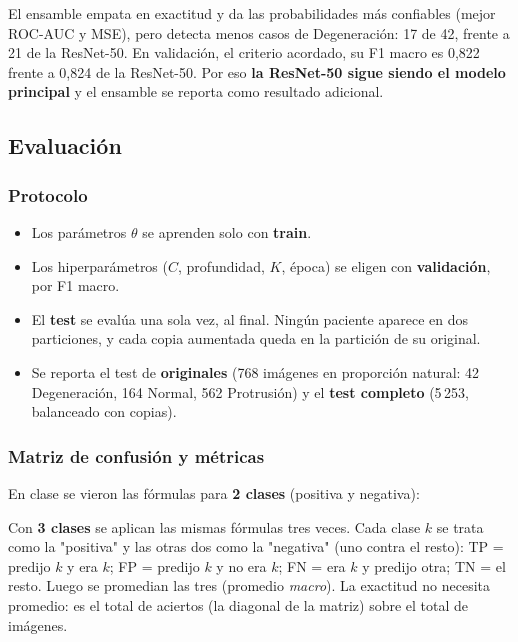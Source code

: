 El ensamble empata en exactitud y da las probabilidades más confiables (mejor ROC-AUC y MSE), pero detecta menos casos de Degeneración: 17 de 42, frente a 21 de la ResNet-50. En validación, el criterio acordado, su F1 macro es 0,822 frente a 0,824 de la ResNet-50. Por eso \textbf{la ResNet-50 sigue siendo el modelo principal} y el ensamble se reporta como resultado adicional.


\subsection{Evaluación}
\label{mm:4}

\subsubsection{Protocolo}
\label{mm:4.1}
\begin{itemize}
  \item Los parámetros $\theta$ se aprenden solo con \textbf{train}.
  \item Los hiperparámetros ($C$, profundidad, $K$, época) se eligen con \textbf{validación}, por F1 macro.
  \item El \textbf{test} se evalúa una sola vez, al final. Ningún paciente aparece en dos particiones, y cada copia aumentada queda en la partición de su original.
  \item Se reporta el test de \textbf{originales} (768 imágenes en proporción natural: 42 Degeneración, 164 Normal, 562 Protrusión) y el \textbf{test completo} (5\,253, balanceado con copias).
\end{itemize}

\subsubsection{Matriz de confusión y métricas}
\label{mm:4.2}
En clase se vieron las fórmulas para \textbf{2 clases} (positiva y negativa):

\begin{center}
\end{center}

Con \textbf{3 clases} se aplican las mismas fórmulas tres veces. Cada clase $k$ se trata como la "positiva" y las otras dos como la "negativa" (uno contra el resto): TP = predijo $k$ y era $k$; FP = predijo $k$ y no era $k$; FN = era $k$ y predijo otra; TN = el resto. Luego se promedian las tres (promedio \emph{macro}). La exactitud no necesita promedio: es el total de aciertos (la diagonal de la matriz) sobre el total de imágenes.

